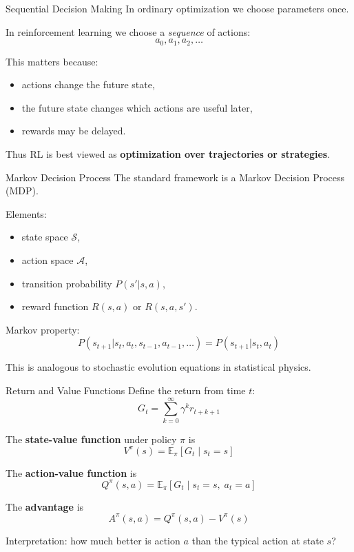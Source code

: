 \documentclass[aspectratio=169]{beamer}
\begin{document}
\begin{frame}{Sequential Decision Making}
  In ordinary optimization we choose parameters once.

  In reinforcement learning we choose a \emph{sequence} of actions:
  \[
  a_0,a_1,a_2,\dots
  \]

  This matters because:
  \begin{itemize}
  \item actions change the future state,
  \item the future state changes which actions are useful later,
  \item rewards may be delayed.
  \end{itemize}

  Thus RL is best viewed as \textbf{optimization over trajectories or strategies}.
\end{frame}

\begin{frame}{Markov Decision Process}
  The standard framework is a Markov Decision Process (MDP).

  Elements:
  \begin{itemize}
  \item state space $\mathcal S$,
  \item action space $\mathcal A$,
  \item transition probability $P(s'|s,a)$,
  \item reward function $R(s,a)$ or $R(s,a,s')$.
  \end{itemize}

  Markov property:
  \[
  P(s_{t+1}|s_t,a_t,s_{t-1},a_{t-1},\dots)=P(s_{t+1}|s_t,a_t)
  \]

  This is analogous to stochastic evolution equations in statistical physics.
\end{frame}

\begin{frame}{Return and Value Functions}
  Define the return from time $t$:
  \[
  G_t = \sum_{k=0}^\infty \gamma^k r_{t+k+1}
  \]

  The \textbf{state-value function} under policy $\pi$ is
  \[
  V^\pi(s)=\mathbb{E}_\pi[G_t\mid s_t=s]
  \]

  The \textbf{action-value function} is
  \[
  Q^\pi(s,a)=\mathbb{E}_\pi[G_t\mid s_t=s,\; a_t=a]
  \]

  The \textbf{advantage} is
  \[
  A^\pi(s,a)=Q^\pi(s,a)-V^\pi(s)
  \]

  Interpretation: how much better is action $a$ than the typical action at state $s$?
\end{frame}
\end{document}
